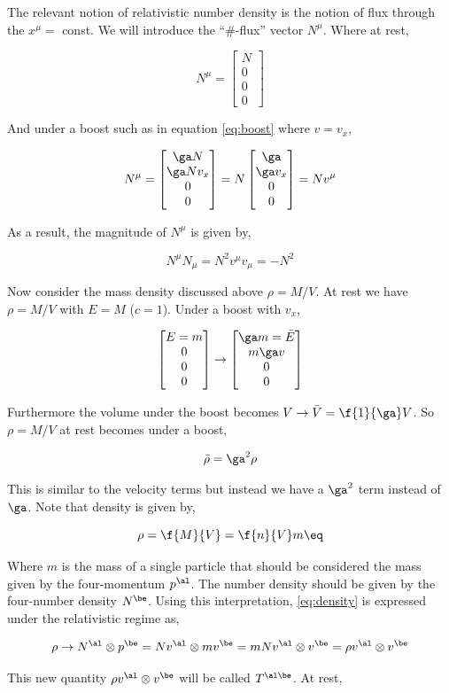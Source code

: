 \documentclass{article}
\newcommand{\mtrx}[1]{
    \begin{bmatrix}
    #1
    \end{bmatrix}
}
\begin{document}
The relevant notion of relativistic number density is the notion of flux through the $x^\mu = $ const. We will introduce the ``\#-flux'' vector $N^\mu$. Where at rest,

\[ N^\mu = \mtrx{N \\ 0 \\ 0 \\ 0} \]

And under a boost such as in equation \eqref{eq:boost} where $v = v_x$,

\[ N^\mu = \mtrx{\ga N \\ \ga N v_x \\ 0 \\ 0} = N \mtrx{\ga \\ \ga v_x \\ 0 \\ 0} = N v^\mu \]

As a result, the magnitude of $N^\mu$ is given by,

\[ N^\mu N_\mu = N^2 v^\mu v_\mu = - N^2 \]

Now consider the mass density discussed above $\rho = M/V$. At rest we have $\rho = M/V$ with $E = M$ ($c=1$). Under a boost with $v_x$,

\[ \mtrx{E = m \\ 0 \\ 0 \\ 0} \to \mtrx{\ga m = \bar{E} \\ m \ga v \\ 0 \\ 0} \]

Furthermore the volume under the boost becomes $V \to \bar{V} = \f{1}{\ga} V$. So $\rho = M/V$ at rest becomes under a boost,

\[ \bar{\rho} = \ga^2 \rho \]

This is similar to the velocity terms but instead we have a $\ga^2$ term instead of $\ga$. Note that density is given by,

\[ \rho = \f{M}{V} = \f{n}{V} m \eq \label{eq:density}\]

Where $m$ is the mass of a single particle that should be considered the mass given by the four-momentum $p^\al$. The number density should be given by the four-number density $N^\be$. Using this interpretation, \eqref{eq:density} is expressed under the relativistic regime as,

\[ \rho \to  N^\al \otimes p^\be = N v^\al \otimes m v^\be = m N v^\al \otimes v^\be = \rho v^\al \otimes v^\be \]

This new quantity $\rho v^\al \otimes v^\be$ will be called $T^{\al\be}$. At rest,
\end{document}
